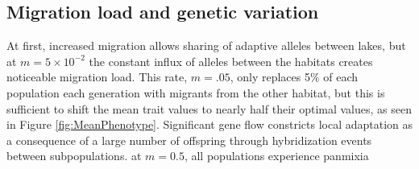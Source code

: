 \documentclass{article}
\begin{document}

\subsection*{Migration load and genetic variation}

At first, increased migration allows sharing of adaptive alleles between lakes,
but at $m = 5 \times 10^{-2}$
the constant influx of alleles between the habitats creates noticeable migration load.
This rate, $m=.05$, only replaces 5\% of each population each generation
with migrants from the other habitat, but this is sufficient to shift the mean trait values
to nearly half their optimal values, as seen in Figure \ref{fig:MeanPhenotype}.
Significant gene flow constricts local adaptation
as a consequence of a large number of offspring through hybridization events between subpopulations.
at $m=0.5$, all populations experience panmixia 
\end{document}
